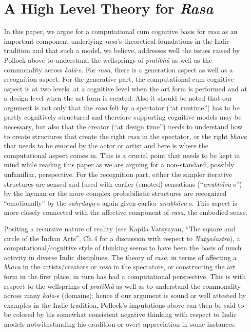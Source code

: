 \section{A High Level Theory for \textsl{Rasa}}\label{chap3-sec3}

In this paper, we argue for a computational cum cognitive basis for \textsl{rasa} as an important component underlying \textsl{rasa}’s theoretical foundations in the Indic tradition and that such a model, we believe, addresses well the issues raised by Pollock above to understand the wellsprings of \textsl{pratibhā} as well as the commonality across \textsl{kalā}-s. For \textsl{rasa}, there is a generation aspect as well as a recognition aspect. For the generative part, the computational cum cognitive aspect is at two levels: at a cognitive level when the art form is performed and at a design level when the art form is created. Also it should be noted that our argument is not only that the \textsl{rasa} felt by a spectator (“at runtime”) has to be partly cognitively structured and therefore supporting cognitive models may be necessary, but also that the creator (“at design time”) needs to understand how to create structures that create the right \textsl{rasa} in the spectator, or the right \textsl{bhāva} that needs to be emoted by the actor or artist and here is where the computational aspect comes in. This is a crucial point that needs to be kept in mind while reading this paper as we are arguing for a non-standard, possibly unfamiliar, perspective. For the recognition part, either the simpler iterative structures are sensed and fused with earlier (emoted) sensations (“\textsl{anubhāva}-s”) by the layman or the more complex probabilistic structures are recognized “emotionally” by the \textsl{sahṛdaya}-s again given earlier \textsl{anubhāva}-s. This aspect is more closely connected with the affective component of \textsl{rasa}, the embodied sense.

Positing a recursive nature of reality (see Kapila Vatsyayan, “The square and circle of the Indian Arts”, Ch.4 for a discussion with respect to \textsl{Nāṭyaśāstra}), a computational/cognitive style of thinking seems to have been the basis of much activity in diverse Indic disciplines. The theory of \textsl{rasa}, in terms of affecting a \textsl{bhāva} in the artists/creators or \textsl{rasa} in the spectators, or constructing the art form in the first place, in turn has had a computational perspective. This is with respect to the wellsprings of \textsl{pratibhā} as well as to understand the commonality across many \textsl{kalā}-s (domains); hence if our argument is sound or well attested by examples in the Indic tradition, Pollock’s imputations above can then be said to be colored by his somewhat consistent negative thinking with respect to Indic models notwithstanding his erudition or overt appreciation in some instances. 

